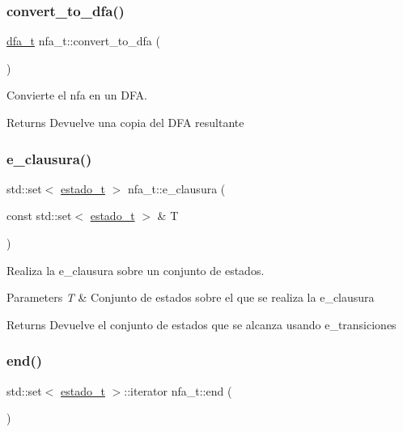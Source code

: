 \subsubsection{\texorpdfstring{convert\+\_\+to\+\_\+dfa()}{convert\_to\_dfa()}}
{\footnotesize\ttfamily \hyperlink{classdfa__t}{dfa\+\_\+t} nfa\+\_\+t\+::convert\+\_\+to\+\_\+dfa (\begin{DoxyParamCaption}{ }\end{DoxyParamCaption})}



Convierte el nfa en un D\+FA. 

\begin{DoxyReturn}{Returns}
Devuelve una copia del D\+FA resultante 
\end{DoxyReturn}
\mbox{\label{classnfa__t_a8d823ef60bb25868b5c768ff54285cce}} 
\subsubsection{\texorpdfstring{e\+\_\+clausura()}{e\_clausura()}}
{\footnotesize\ttfamily std\+::set$<$ \hyperlink{classestado__t}{estado\+\_\+t} $>$ nfa\+\_\+t\+::e\+\_\+clausura (\begin{DoxyParamCaption}\item[{const std\+::set$<$ \hyperlink{classestado__t}{estado\+\_\+t} $>$ \&}]{T }\end{DoxyParamCaption})}



Realiza la e\+\_\+clausura sobre un conjunto de estados. 


\begin{DoxyParams}{Parameters}
{\em T} & Conjunto de estados sobre el que se realiza la e\+\_\+clausura \\
\hline
\end{DoxyParams}
\begin{DoxyReturn}{Returns}
Devuelve el conjunto de estados que se alcanza usando e\+\_\+transiciones 
\end{DoxyReturn}
\mbox{\label{classnfa__t_abaa08ab9e3a46ee1eea80e108cd5a01c}} 
\subsubsection{\texorpdfstring{end()}{end()}}
{\footnotesize\ttfamily std\+::set$<$ \hyperlink{classestado__t}{estado\+\_\+t} $>$\+::iterator nfa\+\_\+t\+::end (\begin{DoxyParamCaption}{ }\end{DoxyParamCaption})}



